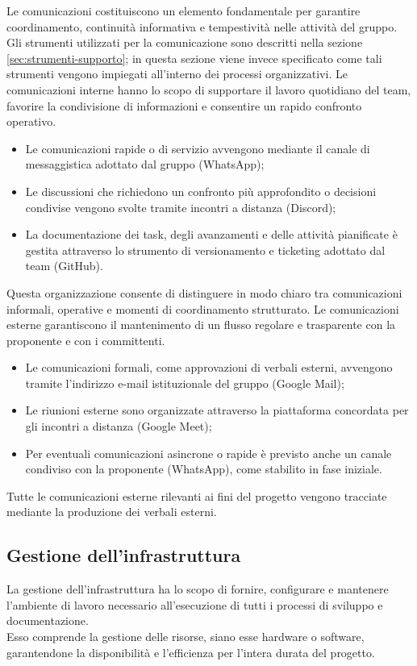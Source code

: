 Le comunicazioni costituiscono un elemento fondamentale per garantire coordinamento, continuità informativa e tempestività nelle attività del gruppo. Gli strumenti utilizzati per la comunicazione sono descritti nella sezione \ref{sec:strumenti-supporto}; in questa sezione viene invece specificato come tali strumenti vengono impiegati all’interno dei processi organizzativi.
Le comunicazioni interne hanno lo scopo di supportare il lavoro quotidiano del team, favorire la condivisione di informazioni e consentire un rapido confronto operativo.
\begin{itemize}[itemsep=3pt, parsep=1pt, label=$\scriptstyle\bullet$]
    \item Le comunicazioni rapide o di servizio avvengono mediante il canale di messaggistica adottato dal gruppo (WhatsApp);
    \item Le discussioni che richiedono un confronto più approfondito o decisioni condivise vengono svolte tramite incontri a distanza (Discord);
    \item La documentazione dei task, degli avanzamenti e delle attività pianificate è gestita attraverso lo strumento di versionamento e ticketing adottato dal team (GitHub).
\end{itemize}
Questa organizzazione consente di distinguere in modo chiaro tra comunicazioni informali, operative e momenti di coordinamento strutturato.
Le comunicazioni esterne garantiscono il mantenimento di un flusso regolare e trasparente con la proponente e con i committenti.
\begin{itemize}[itemsep=3pt, parsep=1pt, label=$\scriptstyle\bullet$]
    \item Le comunicazioni formali, come approvazioni di verbali esterni, avvengono tramite l’indirizzo e-mail istituzionale del gruppo (Google Mail);
    \item Le riunioni esterne sono organizzate attraverso la piattaforma concordata per gli incontri a distanza (Google Meet);
    \item Per eventuali comunicazioni asincrone o rapide è previsto anche un canale condiviso con la proponente (WhatsApp), come stabilito in fase iniziale.
\end{itemize}
Tutte le comunicazioni esterne rilevanti ai fini del progetto vengono tracciate mediante la produzione dei verbali esterni.

\subsection{Gestione dell'infrastruttura}
La gestione dell'infrastruttura ha lo scopo di fornire, configurare e mantenere l’ambiente di lavoro necessario all'esecuzione di tutti i processi di sviluppo e documentazione.\\
Esso comprende la gestione delle risorse, siano esse hardware o software, garantendone la disponibilità e l'efficienza per l'intera durata del progetto.
